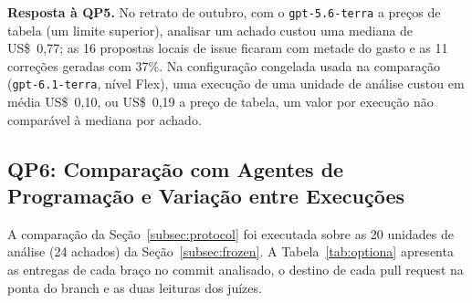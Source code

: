 \documentclass[conference]{IEEEtran}
\newcommand{\researchq}[1]{\textbf{QP#1}}
\begin{document}
\textbf{Resposta à \researchq{5}.} No retrato de outubro, com o
\texttt{gpt-5.6-terra} a preços de tabela (um limite superior), analisar um achado
custou uma mediana de US\$~0,77; as 16 propostas locais de issue ficaram com
metade do gasto e as 11 correções geradas com 37\%. Na
configuração congelada usada na comparação (\texttt{gpt-6.1-terra}, nível
Flex), uma execução de uma unidade de análise custou em média US\$~0,10, ou US\$~0,19 a
preço de tabela, um valor por execução não comparável à mediana por achado.

\subsection{\researchq{6}: Comparação com Agentes de Programação e Variação entre Execuções}
\label{subsec:rq6}

A comparação da Seção~\ref{subsec:protocol} foi executada sobre as 20 unidades de
análise (24 achados) da Seção~\ref{subsec:frozen}.
A Tabela~\ref{tab:optiona} apresenta as entregas de cada braço no commit analisado, o
destino de cada pull request na ponta do branch e as duas leituras dos juízes.
\end{document}
